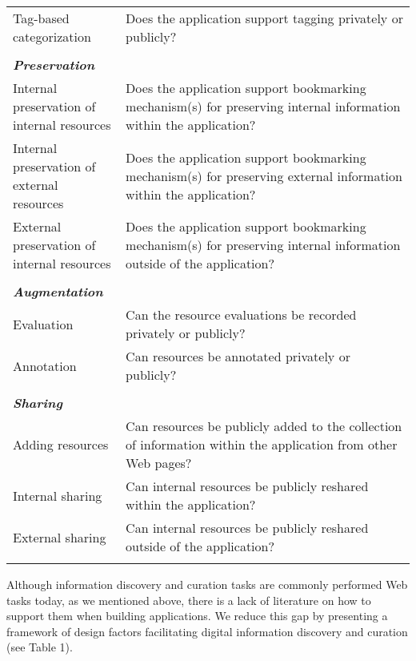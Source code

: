 \documentclass{casconpaper}
\begin{document}
{{\begin{table*}[htbp]
\begin{tabular}{|p{0.28\linewidth}|p{0.72\linewidth}|}
Tag-based categorization               & Does the application support tagging privately or publicly?                                                  \\
&\\
\emph{\textbf{Preservation}}                   &                                                                                                           \\
Internal preservation of internal resources       & Does the application support bookmarking mechanism(s) for preserving internal information within the application?        \\
Internal preservation of external resources       & Does the application support bookmarking mechanism(s) for preserving external information within the application?        \\
External preservation of internal resources      & Does the application support bookmarking mechanism(s) for preserving internal information outside of the application? \\ 
&\\
\emph{\textbf{Augmentation}}            &                                                                                                           \\
Evaluation                   & Can the resource evaluations be recorded privately or publicly? \\
Annotation                   & Can resources be annotated privately or publicly?                                                                               \\    
&\\        
\emph{\textbf{Sharing}}            &                                                                                                           \\
Adding resources             & Can resources be publicly added to the collection of information within the application from other Web pages?     \\
Internal sharing         & Can internal resources be publicly reshared within the application?         \\ 
External sharing          & Can internal resources be publicly reshared outside of the application?         \\ 
&\\           
\hline
\end{tabular}
\end{table*}

Although information discovery and curation tasks are commonly performed Web tasks today, as we mentioned above, there is a lack of literature on how to support them when building applications. We reduce this gap by presenting a framework of design factors facilitating digital information discovery and curation (see Table 1). 

}}
\end{document}
